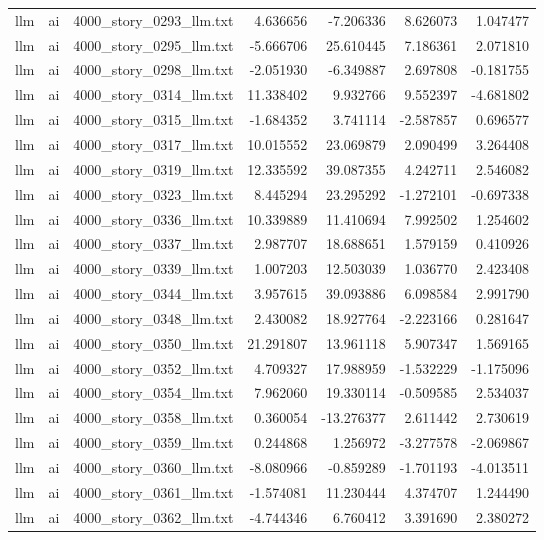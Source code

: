 \begin{longtable}{lllrrrr}
llm & ai & 4000\_story\_0293\_llm.txt & 4.636656 & -7.206336 & 8.626073 & 1.047477 \\
llm & ai & 4000\_story\_0295\_llm.txt & -5.666706 & 25.610445 & 7.186361 & 2.071810 \\
llm & ai & 4000\_story\_0298\_llm.txt & -2.051930 & -6.349887 & 2.697808 & -0.181755 \\
llm & ai & 4000\_story\_0314\_llm.txt & 11.338402 & 9.932766 & 9.552397 & -4.681802 \\
llm & ai & 4000\_story\_0315\_llm.txt & -1.684352 & 3.741114 & -2.587857 & 0.696577 \\
llm & ai & 4000\_story\_0317\_llm.txt & 10.015552 & 23.069879 & 2.090499 & 3.264408 \\
llm & ai & 4000\_story\_0319\_llm.txt & 12.335592 & 39.087355 & 4.242711 & 2.546082 \\
llm & ai & 4000\_story\_0323\_llm.txt & 8.445294 & 23.295292 & -1.272101 & -0.697338 \\
llm & ai & 4000\_story\_0336\_llm.txt & 10.339889 & 11.410694 & 7.992502 & 1.254602 \\
llm & ai & 4000\_story\_0337\_llm.txt & 2.987707 & 18.688651 & 1.579159 & 0.410926 \\
llm & ai & 4000\_story\_0339\_llm.txt & 1.007203 & 12.503039 & 1.036770 & 2.423408 \\
llm & ai & 4000\_story\_0344\_llm.txt & 3.957615 & 39.093886 & 6.098584 & 2.991790 \\
llm & ai & 4000\_story\_0348\_llm.txt & 2.430082 & 18.927764 & -2.223166 & 0.281647 \\
llm & ai & 4000\_story\_0350\_llm.txt & 21.291807 & 13.961118 & 5.907347 & 1.569165 \\
llm & ai & 4000\_story\_0352\_llm.txt & 4.709327 & 17.988959 & -1.532229 & -1.175096 \\
llm & ai & 4000\_story\_0354\_llm.txt & 7.962060 & 19.330114 & -0.509585 & 2.534037 \\
llm & ai & 4000\_story\_0358\_llm.txt & 0.360054 & -13.276377 & 2.611442 & 2.730619 \\
llm & ai & 4000\_story\_0359\_llm.txt & 0.244868 & 1.256972 & -3.277578 & -2.069867 \\
llm & ai & 4000\_story\_0360\_llm.txt & -8.080966 & -0.859289 & -1.701193 & -4.013511 \\
llm & ai & 4000\_story\_0361\_llm.txt & -1.574081 & 11.230444 & 4.374707 & 1.244490 \\
llm & ai & 4000\_story\_0362\_llm.txt & -4.744346 & 6.760412 & 3.391690 & 2.380272 \\

\end{longtable}

